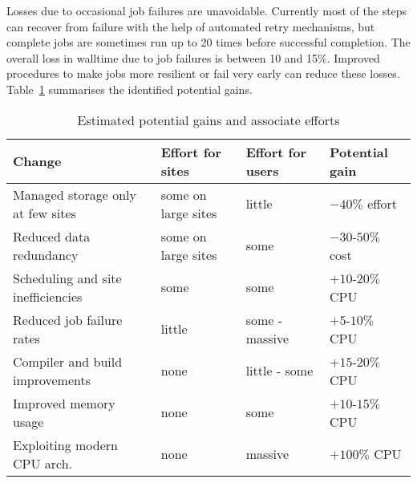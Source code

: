 Losses due to occasional job failures are unavoidable. Currently most
of the steps can recover from failure with the help of automated retry
mechanisms, but complete jobs are sometimes run up to 20 times before
successful completion. The overall loss in walltime due to job
failures is between 10 and 15\%. Improved procedures to make jobs more
resilient or fail very early can reduce these losses.
Table~\ref{tab:pgain} summarises the identified potential gains.

\begin{table}
  \centering
  \caption{Estimated potential gains and associate efforts}
  \label{tab:pgain}
  \begin{tabular}{llll}
    \hline
    Change & Effort for sites & Effort for users & Potential gain \\\hline
    Managed storage only at few sites & some on large sites & little & $-40\%$ effort \\
    Reduced data redundancy & some on large sites & some & $-30$-$50\%$ cost \\
    Scheduling and site inefficiencies & some & some & $+10$-$20\%$ CPU  \\
    Reduced job failure rates & little & some - massive & $+5$-$10\%$ CPU \\
    Compiler and build improvements & none &  little - some & $+15$-$20\%$ CPU \\
    Improved memory usage & none & some &  $+10$-$15\%$ CPU \\ 
    Exploiting modern CPU arch. &  none & massive & $+100\%$ CPU \\\hline
  \end{tabular}
\end{table}

